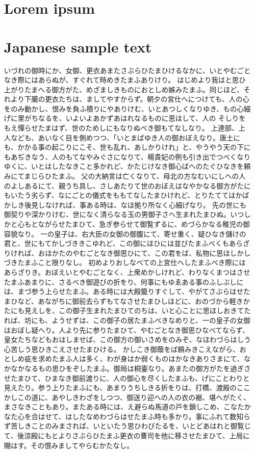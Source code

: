 \documentclass[a4paper,11pt]{TUmemorandum}
\begin{document}
\section*{Lorem ipsum}
%
\lipsum[1-6] \par
%
\section*{Japanese sample text}
%
いづれの御時にか、女御、更衣あまたさぶらひたまひけるなかに、いとやむごとなき際にはあらぬが、すぐれて時めきたまふありけり。
はじめより我はと思ひ上がりたまへる御方がた、めざましきものにおとしめ嫉みたまふ。同じほど、それより下臈の更衣たちは、ましてやすからず。朝夕の宮仕へにつけても、人の心をのみ動かし、恨みを負ふ積りにやありけむ、いとあつしくなりゆき、もの心細げに里がちなるを、いよいよあかずあはれなるものに思ほして、人の そしりをもえ憚らせたまはず、世のためしにもなりぬべき御もてなしなり。
上達部、上人なども、あいなく目を側めつつ、「いとまばゆき人の御おぼえなり。唐土にも、かかる事の起こりにこそ、世も乱れ、あしかりけれ」と、やうやう天の下にもあぢきなう、人のもてなやみぐさになりて、楊貴妃の例も引き出でつべくなりゆくに、いとはしたなきこと多かれど、かたじけなき御心ばへのたぐひなきを頼みにてまじらひたまふ。
父の大納言は亡くなりて、母北の方なむいにしへの人のよしあるにて、親うち具し、さしあたりて世のおぼえはなやかなる御方がたにもいたう劣らず、なにごとの儀式をももてなしたまひけれど、とりたててはかばかしき後見しなければ、事ある時は、なほ拠り所なく心細げなり。
先の世にも御契りや深かりけむ、世になく清らなる玉の男御子さへ生まれたまひぬ。いつしかと心もとながらせたまひて、急ぎ参らせて御覧ずるに、めづらかなる稚児の御容貌なり。
一の皇子は、右大臣の女御の御腹にて、寄せ重く、疑ひなき儲けの君と、世にもてかしづききこゆれど、この御にほひには並びたまふべくもあらざりければ、おほかたのやむごとなき御思ひにて、この君をば、私物に思ほしかしづきたまふこと限りなし。
初めよりおしなべての上宮仕へしたまふべき際にはあらざりき。おぼえいとやむごとなく、上衆めかしけれど、わりなくまつはさせたまふあまりに、さるべき御遊びの折をり、何事にもゆゑある事のふしぶしには、まづ参う上らせたまふ。ある時には大殿籠りすぐして、やがてさぶらはせたまひなど、あながちに御前去らずもてなさせたまひしほどに、おのづから軽きかたにも見えしを、この御子生まれたまひてのちは、いと心ことに思ほしおきてたれば、坊にも、ようせずは、この御子の居たまふべきなめりと、一の皇子の女御はおぼし疑へり。人より先に参りたまひて、やむごとなき御思ひなべてならず、皇女たちなどもおはしませば、この御方の御いさめをのみぞ、なほわづらはしう心苦しう思ひきこえさせたまひける。
かしこき御蔭をば頼みきこえながら、おとしめ疵を求めたまふ人は多く、わが身はか弱くものはかなきありさまにて、なかなかなるもの思ひをぞしたまふ。御局は桐壷なり。あまたの御方がたを過ぎさせたまひて、ひまなき御前渡りに、人の御心を尽くしたまふも、げにことわりと見えたり。参う上りたまふにも、あまりうちしきる折をりは、打橋、渡殿のここかしこの道に、あやしきわざをしつつ、御送り迎への人の衣の裾、堪へがたく、まさなきこともあり。またある時には、え避らぬ馬道の戸を鎖しこめ、こなたかなた心を合はせて、はしたなめわづらはせたまふ時も多かり。事にふれて数知らず苦しきことのみまされば、いといたう思ひわびたるを、いとどあはれと御覧じて、後涼殿にもとよりさぶらひたまふ更衣の曹司を他に移させたまひて、上局に賜はす。その恨みましてやらむかたなし。
\end{document}
